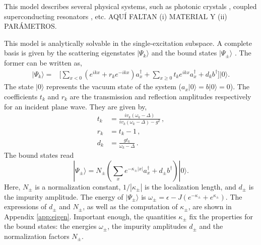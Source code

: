 \documentclass[aps,pra,twocolumn,floatfix,superscriptaddress]{revtex4-1}%
\begin{document}
This model describes several physical systems, such as photonic crystals \cite{Lodahl2015}, coupled superconducting resonators \cite{Liu2017}, etc. {\color{red}AQU\'I FALTAN (i) MATERIAL Y (ii) PAR\'AMETROS.}



This model is analytically solvable in the single-excitation subspace. A complete basis is given by the scattering eigenstates $|\Psi_k\rangle$ \cite{Nori2008a} and the bound states $|\Psi_\pm\rangle$ \cite{Longo2010,Longo2011}. The former can be written as,
\begin{align}
\label{eq:scattering_states} 
|\Psi_k\rangle = & \Big [ \sum_{x<0}(e^{ikx}+r_k e^{-ikx})a_x^\dagger 
 +  \sum_{x\geq 0} t_k e^{ikx} a_x^\dagger 
+ d_k b^\dagger \Big]  |0\rangle.
\end{align}
The state $|0\rangle$ represents the vacuum state of the system ($a_x|0\rangle=b|0\rangle = 0$).
The coefficients 
 $t_k$ and $r_k$ are the  
 transmission and reflection amplitudes respectively
for an incident plane wave.  They are given by, 
\begin{align}
\label{eq:transmission}
t_k & =\frac{iv_k(\omega_k - \Delta)}{iv_k(\omega_k-\Delta)-g^2} \, , 
\\
\label{eq:reflection}
r_k&=t_k-1\, ,
\\ 
d_k  &= \frac{g t_k}{\omega_k-\Delta} \,
\label{eq:d_scattering_states}.
\end{align} 
The bound states read
\begin{equation}
 |\Psi_\pm\rangle =  N_\pm \left(\sum_x e^{-\kappa_\pm |x|} a_x^\dagger + d_\pm b^\dagger\right)|0\rangle.\label{eq:bound_states}
\end{equation} 
Here, $N_\pm$ is a normalization constant, $1/|\kappa_\pm|$ is the localization length, and $d_\pm$ is  the impurity amplitude. The energy of $|\Psi_\pm\rangle$ is $\omega_\pm = \epsilon - J(e^{-\kappa_\pm} + e^{\kappa_\pm})$. The expressions of $d_\pm$ and $N_\pm$, as well as the computation of $\kappa_\pm$, are shown in Appendix \ref{app:eigen}. Important enough, the quantities $\kappa_\pm$ 
fix the properties for the bound states: the energies $\omega_\pm$, the impurity amplitudes $d_\pm$ and the normalization factors $N_\pm$.
\end{document}
